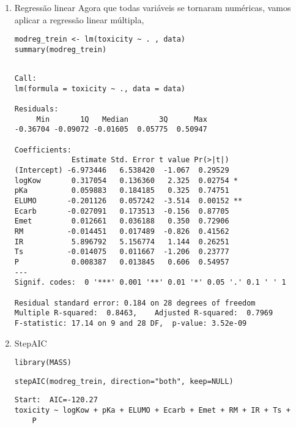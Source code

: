 \documentclass[11pt]{article}
\begin{document}
\begin{enumerate}
\item Regressão linear
\label{sec:org062af61}
Agora que todas variáveis se tornaram numéricas, vamos aplicar a regressão linear múltipla,

\begin{verbatim}
modreg_trein <- lm(toxicity ~ . , data)
summary(modreg_trein)
\end{verbatim}

\begin{verbatim}

Call:
lm(formula = toxicity ~ ., data = data)

Residuals:
     Min       1Q   Median       3Q      Max 
-0.36704 -0.09072 -0.01605  0.05775  0.50947 

Coefficients:
             Estimate Std. Error t value Pr(>|t|)   
(Intercept) -6.973446   6.538420  -1.067  0.29529   
logKow       0.317054   0.136360   2.325  0.02754 * 
pKa          0.059883   0.184185   0.325  0.74751   
ELUMO       -0.201126   0.057242  -3.514  0.00152 **
Ecarb       -0.027091   0.173513  -0.156  0.87705   
Emet         0.012661   0.036188   0.350  0.72906   
RM          -0.014451   0.017489  -0.826  0.41562   
IR           5.896792   5.156774   1.144  0.26251   
Ts          -0.014075   0.011667  -1.206  0.23777   
P            0.008387   0.013845   0.606  0.54957   
---
Signif. codes:  0 '***' 0.001 '**' 0.01 '*' 0.05 '.' 0.1 ' ' 1

Residual standard error: 0.184 on 28 degrees of freedom
Multiple R-squared:  0.8463,	Adjusted R-squared:  0.7969 
F-statistic: 17.14 on 9 and 28 DF,  p-value: 3.52e-09

\end{verbatim}

\item StepAIC
\label{sec:org94872b2}
\begin{verbatim}
library(MASS)
\end{verbatim}

\begin{verbatim}
stepAIC(modreg_trein, direction="both", keep=NULL)
\end{verbatim}

\begin{verbatim}
Start:  AIC=-120.27
toxicity ~ logKow + pKa + ELUMO + Ecarb + Emet + RM + IR + Ts + 
    P


\end{verbatim}
\end{enumerate}
\end{document}
